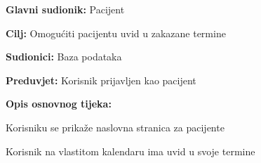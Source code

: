 					\noindent {}
					\begin{packed_item}
	
						\item \textbf{Glavni sudionik: } Pacijent
						\item  \textbf{Cilj:} Omogućiti pacijentu uvid u zakazane termine
						\item  \textbf{Sudionici:} Baza podataka
						\item  \textbf{Preduvjet:} Korisnik prijavljen kao pacijent
						\item  \textbf{Opis osnovnog tijeka:}
						
						\item[] \begin{packed_enum}
	
							\item Korisniku se prikaže naslovna stranica za pacijente
							\item Korisnik na vlastitom kalendaru ima uvid u svoje termine
						\end{packed_enum}
						
					\end{packed_item}
					
